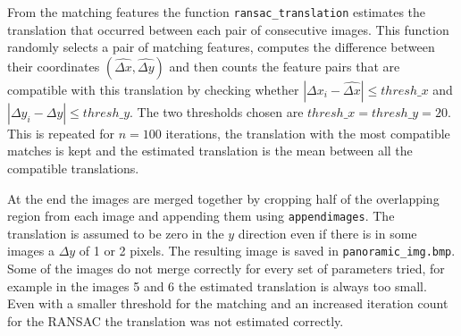 \documentclass[a4paper,oneside]{article}
\newcommand{\inlinecode}[1]{\lstinline[basicstyle=\ttfamily,keywordstyle={},stringstyle={},commentstyle={\itshape}]{#1}}
\newcommand{\abs}[1]{\left|#1\right|}
\begin{document}
From the matching features the function
\inlinecode{ransac_translation} estimates the translation that
occurred between each pair of consecutive images. This function
randomly selects a pair of matching features, computes the difference
between their coordinates $(\hat{\Delta x}, \hat{\Delta y})$ and then
counts the feature pairs that are compatible with this translation by
checking whether $\abs{\Delta x_i - \hat{\Delta x}} \leq
\mathit{thresh\_x}$ and $\abs{\Delta y_i - \hat{\Delta y}} \leq
\mathit{thresh\_y}$. The two thresholds chosen are $\mathit{thresh\_x}
= \mathit{thresh\_y} = 20$. This is repeated for $n=100$ iterations,
the translation with the most compatible matches is kept and the
estimated translation is the mean between all the compatible
translations.

At the end the images are merged together by cropping half of the
overlapping region from each image and appending them using
\inlinecode{appendimages}. The translation is assumed to be zero in
the $y$ direction even if there is in some images a $\Delta y$ of 1 or
2 pixels. The resulting image is saved in
\inlinecode{panoramic_img.bmp}. Some of the images do not merge
correctly for every set of parameters tried, for example in the images
5 and 6 the estimated translation is always too small. Even with a
smaller threshold for the matching and an increased iteration count
for the RANSAC the translation was not estimated correctly.
\end{document}
